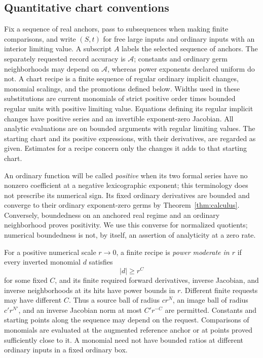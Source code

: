 \subsection{Quantitative chart conventions}

Fix a sequence of real anchors, pass to subsequences when making finite
comparisons, and write $(S,t)$ for free large inputs and ordinary inputs
with an interior limiting value.  A subscript $A$ labels the selected
sequence of anchors.  The separately requested record accuracy is
$\mathcal A$; constants and ordinary germ neighborhoods may depend
on $\mathcal A$, whereas power exponents declared uniform do not.
A chart recipe is a finite sequence of
regular ordinary implicit changes, monomial scalings, and the promotions
defined below.  Widths used in these substitutions are current monomials
of strict positive order times bounded regular units with positive
limiting value.  Equations defining its regular implicit changes have
positive series and an invertible exponent-zero Jacobian.  All analytic
evaluations are on bounded arguments with regular limiting values.  The
starting chart and its positive expressions, with their derivatives, are
regarded as given.  Estimates for a recipe concern only the changes it
adds to that starting chart.

An ordinary function will be called \emph{positive} when its two formal
series have no nonzero coefficient at a negative lexicographic exponent;
this terminology does not prescribe its numerical sign.  Its fixed
ordinary derivatives are bounded and converge to their ordinary
exponent-zero germs by Theorem~\ref{thm:calculus}.  Conversely, boundedness
on an anchored real regime and an ordinary neighborhood proves positivity.
We use this converse for normalized quotients; numerical boundedness is
not, by itself, an assertion of analyticity at a zero rate.

For a positive numerical scale $r\to0$, a finite recipe is
\emph{power moderate in $r$} if every inverted monomial $d$ satisfies
\begin{equation}\label{eq:elimination-moderate}
 |d|\ge r^C
\end{equation}
for some fixed $C$, and its finite required forward derivatives, inverse
Jacobian, and inverse neighborhoods at its hits have power bounds in
$r$.  Different finite requests may have different $C$.  Thus a source
ball of radius $c r^N$, an image ball of radius $c' r^{N'}$, and an inverse
Jacobian norm at most $C' r^{-C}$ are permitted.  Constants and starting
points along the sequence may depend on the request.  Comparisons of
monomials are evaluated at the augmented reference anchor or at points
proved sufficiently close to it.  A monomial need not have bounded ratios
at different ordinary inputs in a fixed ordinary box.

